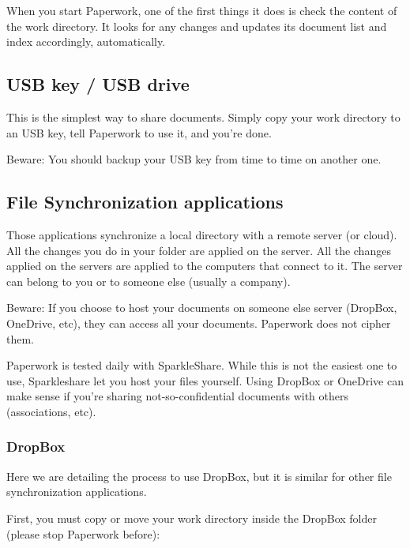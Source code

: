 \documentclass[10pt,a4paper]{article}
\begin{document}
When you start Paperwork, one of the first things it does is check
the content of the work directory. It looks for any changes and updates
its document list and index accordingly, automatically.

\subsection{USB key / USB drive}

This is the simplest way to share documents. Simply copy your work
directory to an USB key, tell Paperwork to use it, and you're done.

Beware: You should backup your USB key from time to time on another
one.

\subsection{File Synchronization applications}

Those applications synchronize a local directory with a remote server
(or cloud). All the changes you do in your folder are applied on the
server. All the changes applied on the servers are applied to the
computers that connect to it. The server can belong to you or to someone
else (usually a company).

Beware: If you choose to host your documents on someone else server
(DropBox, OneDrive, etc), they can access all your documents. Paperwork
does not cipher them.

Paperwork is tested daily with SparkleShare. While this is not the
easiest one to use, Sparkleshare let you host your files yourself.
Using DropBox or OneDrive can make sense if you're sharing not-so-confidential
documents with others (associations, etc).

\subsubsection{DropBox}

Here we are detailing the process to use DropBox, but it is similar
for other file synchronization applications.

First, you must copy or move your work directory inside the DropBox
folder (please stop Paperwork before):

\end{document}
